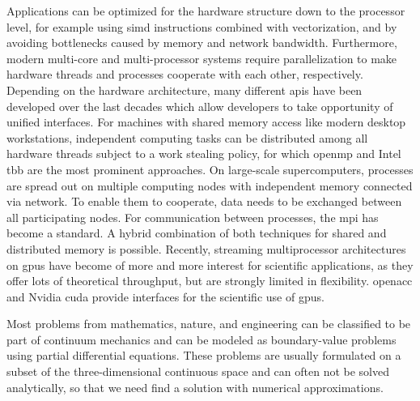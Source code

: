 
Applications can be optimized for the hardware structure down to the processor level, for example using \gls{simd} instructions combined with vectorization, and by avoiding bottlenecks caused by memory and network bandwidth.
Furthermore, modern multi-core and multi-processor systems require parallelization to make hardware threads and processes cooperate with each other, respectively. %
Depending on the hardware architecture, many different \glspl{api} have been developed over the last decades which allow developers to take opportunity of unified interfaces.
For machines with shared memory access like modern desktop workstations, independent computing tasks can be distributed among all hardware threads subject to a work stealing policy, for which \gls{openmp}\textsuperscript{\textregistered} \textcite{openmp50} and Intel\textsuperscript{\textregistered} \gls{tbb} \textcite{tbb2018} are the most prominent approaches.
On large-scale supercomputers, processes are spread out on multiple computing nodes with independent memory connected via network. To enable them to cooperate, data needs to be exchanged between all participating nodes. For communication between processes, the \gls{mpi} \textcite{mpi31} has become a standard. A hybrid combination of both techniques for shared and distributed memory is possible.
Recently, streaming multiprocessor architectures on \glspl{gpu} have become of more and more interest for scientific applications, as they offer lots of theoretical throughput, but are strongly limited in flexibility. \gls{openacc}\textsuperscript{\textregistered} \textcite{openacc27} and Nvidia\textsuperscript{\textregistered} \gls{cuda}\textsuperscript{\textregistered} \textcite{cuda10} provide interfaces for the scientific use of \glspl{gpu}.


Most problems from mathematics, nature, and engineering can be classified to be part of continuum mechanics and can be modeled as boundary-value problems using partial differential equations. These problems are usually formulated on a subset of the three-dimensional continuous space and can often not be solved analytically, so that we need find a solution with numerical approximations.

